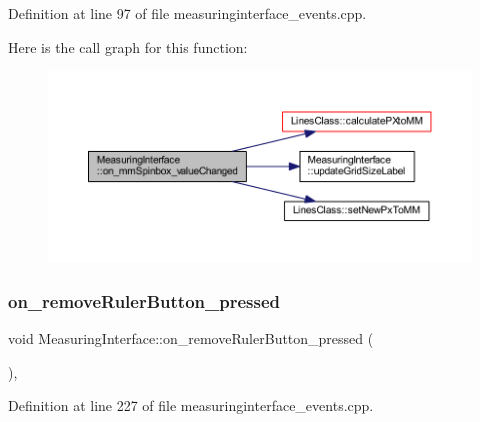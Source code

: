 Definition at line 97 of file measuringinterface\+\_\+events.\+cpp.

Here is the call graph for this function\+:
\nopagebreak
\begin{figure}[H]
\begin{center}
\leavevmode
\includegraphics[width=350pt]{classMeasuringInterface_ac94cdc4a4e60d0910c499b5ed496790a_cgraph}
\end{center}
\end{figure}
\mbox{\label{classMeasuringInterface_a23015fd17f84f8b656cbf4e352b02604}} 
\subsubsection{\texorpdfstring{on\_removeRulerButton\_pressed}{on\_removeRulerButton\_pressed}}
{\footnotesize\ttfamily void Measuring\+Interface\+::on\+\_\+remove\+Ruler\+Button\+\_\+pressed (\begin{DoxyParamCaption}{ }\end{DoxyParamCaption})\hspace{0.3cm}{\ttfamily [private]}, {\ttfamily [slot]}}



Definition at line 227 of file measuringinterface\+\_\+events.\+cpp.

